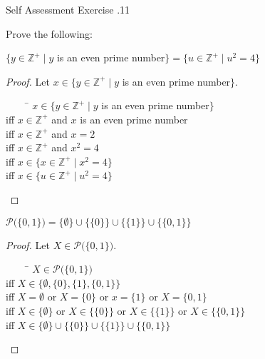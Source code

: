 \documentclass[\main/notes.tex]{subfiles}
\begin{document}
			\pagebreak
			\begin{exercise}{Self Assessment Exercise \thechapter.11}
				\begin{questions}
					\item Prove the following:
						\begin{questions}
							\item $\{y \in \mathbb{Z}^{+} \mid y$ is an even prime number$\} = \{u \in \mathbb{Z}^{+} \mid u^{2} = 4\}$	
								\begin{answer}
									\begin{proof}
										Let $x \in \{y \in \mathbb{Z}^{+} \mid y$ is an even prime number$\}$.
										\begin{tabbing}
											$\qquad$ \= $x \in \{y \in \mathbb{Z}^{+} \mid y$ is an even prime number$\}$\\
											iff      \> $x \in \mathbb{Z}^{+}$ and $x$ is an even prime number\\
											iff      \> $x \in \mathbb{Z}^{+}$ and $x = 2$\\
											iff      \> $x \in \mathbb{Z}^{+}$ and $x^{2} = 4$\\
											iff      \> $x \in \{x \in \mathbb{Z}^{+} \mid x^{2} = 4\}$\\
											iff      \> $x \in \{u \in \mathbb{Z}^{+} \mid u^{2} = 4\}$
										\end{tabbing}
									\end{proof}
								\end{answer}
							\item $\mathcal{P}\bigl(\{0, 1\}\bigr) = \{\emptyset\} \cup \bigl\{\{0\}\bigr\} \cup \bigl\{\{1\}\bigr\} \cup \bigl\{\{0, 1\}\bigr\}$
								\begin{answer}
									\begin{proof}
										Let $X \in \mathcal{P}\bigl(\{0, 1\}\bigr)$.
										\begin{tabbing}
											$\qquad$ \= $X \in \mathcal{P}\bigl(\{0, 1\}\bigr)$\\
											iff \> $X \in \bigl\{\emptyset, \{0\}, \{1\}, \{0, 1\}\bigr\}$\\
											iff \> $X = \emptyset$ or $X = \{0\}$ or $x = \{1\}$ or $X = \{0, 1\}$\\
											iff \> $X \in \{\emptyset\}$ or $X \in \bigl\{\{0\}\bigr\}$ or $X \in \bigl\{\{1\}\bigr\}$ or $X \in \bigl\{\{0, 1\}\bigr\}$\\
											iff \> $X \in \{\emptyset\} \cup \bigl\{\{0\}\bigr\} \cup \bigl\{\{1\}\bigr\} \cup \bigl\{\{0, 1\}\bigr\}$

\end{tabbing}
\end{proof}
\end{answer}
\end{questions}
\end{questions}
\end{exercise}
\end{document}
